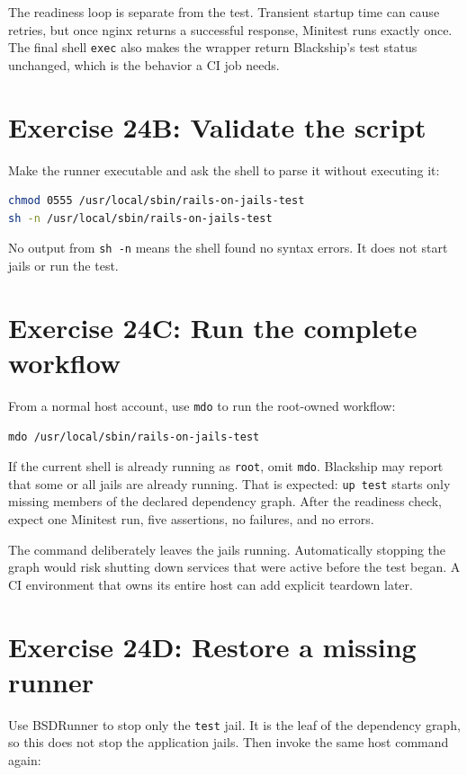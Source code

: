 The readiness loop is separate from the test. Transient startup time can cause
retries, but once nginx returns a successful response, Minitest runs exactly
once. The final shell \texttt{exec} also makes the wrapper return Blackship's
test status unchanged, which is the behavior a CI job needs.

\section{Exercise 24B: Validate the script}

Make the runner executable and ask the shell to parse it without executing it:

\begin{lstlisting}[language=sh]
chmod 0555 /usr/local/sbin/rails-on-jails-test
sh -n /usr/local/sbin/rails-on-jails-test
\end{lstlisting}

No output from \texttt{sh -n} means the shell found no syntax errors. It does
not start jails or run the test.

\section{Exercise 24C: Run the complete workflow}

From a normal host account, use \texttt{mdo} to run the root-owned workflow:

\begin{lstlisting}[language=sh]
mdo /usr/local/sbin/rails-on-jails-test
\end{lstlisting}

If the current shell is already running as \texttt{root}, omit \texttt{mdo}.
Blackship may report that some or all jails are already running. That is
expected: \texttt{up test} starts only missing members of the declared
dependency graph. After the readiness check, expect one Minitest run, five
assertions, no failures, and no errors.

The command deliberately leaves the jails running. Automatically stopping the
graph would risk shutting down services that were active before the test began.
A CI environment that owns its entire host can add explicit teardown later.

\section{Exercise 24D: Restore a missing runner}

Use BSDRunner to stop only the \texttt{test} jail. It is the leaf of the
dependency graph, so this does not stop the application jails. Then invoke the
same host command again:

